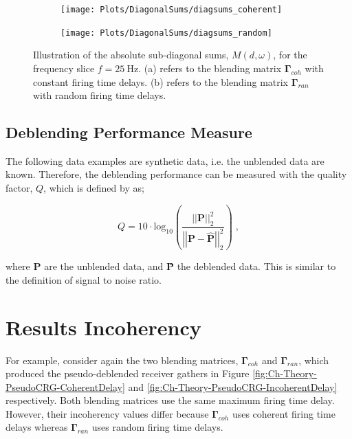 \begin{figure}
	
	\centering
	\begin{subfigure}[b]{0.45\textwidth}
	\centering
	\texttt{[image: Plots/DiagonalSums/diagsums\_coherent]}	
	\caption{}
	\label{fig:Ch-Incoherency-CoherentDiag}	
	\end{subfigure}
	\centering
	\begin{subfigure}[b]{0.45\textwidth}
	\centering
	\texttt{[image: Plots/DiagonalSums/diagsums\_random]}	
	\caption{}
	\label{fig:Ch-Incoherency-RandomDiag}	
	\end{subfigure}
	
	\caption{Illustration of the absolute sub-diagonal sums, $M(d,\omega)$, for the frequency slice $f=\SI{25}{\hertz}$. (a) refers to the blending matrix $\mathbf{\Gamma}_{coh}$ with constant firing time delays.  (b) refers to the blending matrix $\mathbf{\Gamma}_{ran}$ with random firing time delays.}
	\label{fig:Ch-Incoherency-Coh-vs-Ran-Diag}
	
\end{figure}


\subsection*{Deblending Performance Measure}

The following data examples are synthetic data, i.e. the unblended data are known. Therefore, the deblending performance can be measured with the quality factor, $Q$, which is defined by \citet{IbrahimQuality} as;

\begin{equation}
	Q = 10 \cdot \mathrm{log_{10}} \left( \frac{\left|\left|\mathbf{P}\right|\right| _2 ^2}{\left|\left|\mathbf{P - \hat{P}}\right|\right| _2 ^2} \right) \;,	
\end{equation}

where $\mathbf{P}$ are the unblended data, and \textbf{\^{P}} the deblended data. This is similar to the definition of signal to noise ratio. 





\section{Results Incoherency}

For example, consider again the two blending matrices, $\mathbf{\Gamma}_{coh}$ and $\mathbf{\Gamma}_{ran}$, which produced the pseudo-deblended receiver gathers in Figure \ref{fig:Ch-Theory-PseudoCRG-CoherentDelay} and \ref{fig:Ch-Theory-PseudoCRG-IncoherentDelay} respectively. Both blending matrices use the same maximum firing time delay. However, their incoherency values differ because $\mathbf{\Gamma}_{coh}$ uses coherent firing time delays whereas $\mathbf{\Gamma}_{ran}$ uses random firing time delays. 

